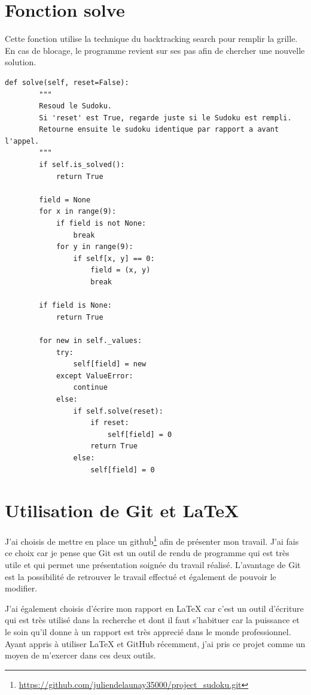 \documentclass[12pt]{article}
\begin{document}
\section{Fonction solve}
\label{solve}
Cette fonction utilise la technique du backtracking search pour remplir la grille. En cas de blocage, le programme revient sur ses pas afin de chercher une nouvelle solution.
\begin{lstlisting}
def solve(self, reset=False):
        """
        Resoud le Sudoku.
        Si 'reset' est True, regarde juste si le Sudoku est rempli.
        Retourne ensuite le sudoku identique par rapport a avant l'appel.
        """
        if self.is_solved():
            return True

        field = None
        for x in range(9):
            if field is not None:
                break
            for y in range(9):
                if self[x, y] == 0:
                    field = (x, y)
                    break

        if field is None:
            return True

        for new in self._values:
            try:
                self[field] = new
            except ValueError:
                continue
            else:
                if self.solve(reset):
                    if reset:
                        self[field] = 0
                    return True
                else:
                    self[field] = 0

\end{lstlisting}

\section{Utilisation de Git et LaTeX}
J'ai choisis de mettre en place un github\footnote{\url{https://github.com/juliendelaunay35000/project_sudoku.git}} afin de présenter mon travail. J'ai fais ce choix car je pense que Git est un outil de rendu de programme qui est très utile et qui permet une présentation soignée du travail réalisé.
L'avantage de Git est la possibilité de retrouver le travail effectué et également de pouvoir le modifier.

J'ai également choisis d'écrire mon rapport en LaTeX car c'est un outil d'écriture qui est très utilisé dans la recherche et dont il faut s'habituer car la puissance et le soin qu'il donne à un rapport est très apprecié dans le monde professionnel. Ayant appris à utiliser LaTeX et GitHub récemment, j'ai pris ce projet comme un moyen de m'exercer dans ces deux outils.
\end{document}
